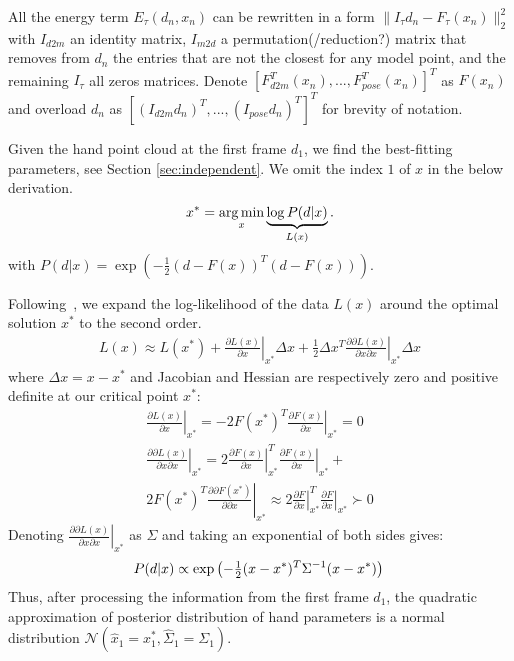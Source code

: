 All the energy term $E_{\tau}(d_n, x_n)$ can be rewritten in a form $\|I_{\tau} d_n - F_{\tau} (x_n)\|_2^2$ with $I_{d2m}$ an identity matrix, $I_{m2d}$ a permutation(/reduction?) matrix that removes from $d_n$ the entries that are not the closest for any model point, and the remaining $I_{\tau}$ all zeros matrices.
% 
Denote $\left[F_{d2m}^T(x_n), ..., F_{pose}^T(x_n)\right]^T$ as $F(x_n)$ and overload $d_n$ as  $\left[(I_{d2m} d_n)^T, ..., (I_{pose} d_n)^T\right]^T$  for brevity of notation.

Given the hand point cloud at the first frame $d_1$, we find the best-fitting parameters, see Section \ref{sec:independent}.  We omit the index $1$ of $x$ in the below derivation.
\begin{equation}
x^* = \operatorname*{arg\,min}_{x} \underbrace{\log  P(d|x)}_{L(x)} \label{eq:independent}. 
\end{equation}
%
with $P(d|x) = \exp \left( - \tfrac{1}{2}(d - F(x))^T (d - F(x)) \right)$.

Following~, we expand the log-likelihood of the data $L(x)$ around the optimal solution $x^*$ to the second order.
%
\begin{align}
L(x) \approx L(x^*)   
+ \left. \tfrac{\partial L(x) }{\partial x}\right|_{x^*}  \Delta x 
+ \left. \tfrac{1}{2} \Delta x^T\tfrac{\partial \partial L(x)}{\partial x \partial x} \right|_{x^*} \Delta x 
\end{align}
%
where $\Delta x=x - x^*$ and Jacobian and Hessian are respectively zero and positive definite at our critical point $x^*$:
%
\begin{align*}
\left.\tfrac{\partial L(x)}{\partial x} \right|_{x^*} = - 2 F(x^*)^T 
\left.\tfrac{\partial F(x)}{\partial x}\right|_{x^*} = 0 
\\
\left. \tfrac{\partial \partial L(x)}{\partial x \partial x}  \right|_{x^*}  = 
2 \left.\tfrac{\partial F(x)}{\partial x}\right|_{x^*}^T 
\left.\tfrac{\partial F(x)}{\partial x}\right|_{x^*} + \\
2 F(x^*)^T  \left. \tfrac{\partial \partial F (x^*) }{\partial \partial x} \right|_{x^*}
\approx 2
\left.\tfrac{\partial F}{\partial x}\right|_{x^*}^T  
\left.\tfrac{\partial F}{\partial x}\right|_{x^*}
\succ 0
\end{align*}
% 
Denoting $\left. \tfrac{\partial \partial L(x)}{\partial x \partial x}  \right|_{x^*}  $ as $\Sigma$ and taking an exponential of both sides gives:
%
\begin{equation}
P(d|x) \propto \exp\left(- \tfrac{1}{2}(x - x^*)^T \Sigma^{-1}  (x - x^*) \right)\\
\end{equation}
% 
Thus, after processing the information from the first frame $d_1$, the quadratic approximation of posterior distribution of hand parameters is a normal distribution $\mathcal{N}\left(\hat{x}_1 = x_1^*,  \hat{\Sigma}_1 = \Sigma_1 \right)$.
%

